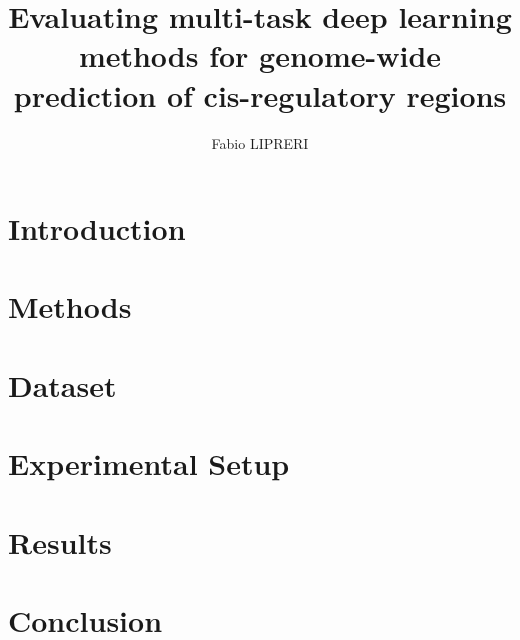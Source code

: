\documentclass[a4paper, 12pt]{report}
\begin{document}
\title{Evaluating multi-task deep learning methods for genome-wide prediction of cis-regulatory regions}
\author{Fabio LIPRERI}
%
% 
%
\beforepreface
{}

\afterpreface




\chapter{Introduction}


\chapter{Methods} \label{cap:methods}


\chapter{Dataset}


\chapter{Experimental Setup}
 \label{cap:experimental_seup}

\chapter{Results}


\chapter{Conclusion}

\end{document}
